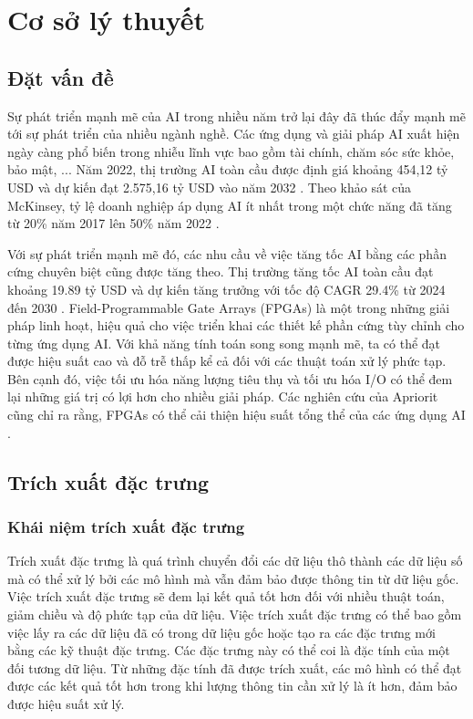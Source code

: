 \clearpage
{}

\setcounter{chapter}{0}
\chapter[{CƠ SỞ LÝ THUYẾT}]{Cơ sở lý thuyết}
\section{Đặt vấn đề}
Sự phát triển mạnh mẽ của AI trong nhiều năm trở lại đây đã thúc đẩy mạnh mẽ tới sự phát triển của nhiều ngành nghề. Các ứng dụng và giải pháp AI xuất hiện ngày càng phổ biến trong nhiễu lĩnh vực bao gồm tài chính, chăm sóc sức khỏe, bảo mật, ... Năm 2022, thị trường AI toàn cầu được định giá khoảng 454,12 tỷ USD và dự kiến đạt 2.575,16 tỷ USD vào năm 2032 \cite{AIMARKET}. Theo khảo sát của McKinsey, tỷ lệ doanh nghiệp áp dụng AI ít nhất trong một chức năng đã tăng từ 20\% năm 2017 lên 50\% năm 2022 \cite{mckinsey}.

Với sự phát triển mạnh mẽ đó, các nhu cầu về việc tăng tốc AI bằng các phần cứng chuyên biệt cũng được tăng theo. Thị trường tăng tốc AI toàn cầu đạt khoảng 19.89 tỷ USD và dự kiến tăng trưởng với tốc độ CAGR 29.4\% từ 2024 đến 2030 \cite{aiaccelerator}. 
Field-Programmable Gate Arrays (FPGAs) là một trong những giải pháp linh hoạt, hiệu quả cho việc triển khai các thiết kế phần cứng tùy chỉnh cho từng ứng dụng AI. Với khả năng tính toán song song mạnh mẽ, ta có thể đạt được hiệu suất cao và đỗ trễ thấp kể cả đối với các thuật toán xử lý phức tạp. Bên cạnh đó, việc tối ưu hóa năng lượng tiêu thụ và tối ưu hóa I/O có thể đem lại những giá trị có lợi hơn cho nhiều giải pháp. Các nghiên cứu của Apriorit cũng chỉ ra rằng, FPGAs có thể cải thiện hiệu suất tổng thể của các ứng dụng AI \cite{apriorit}.
\section{Trích xuất đặc trưng}
\subsection{Khái niệm trích xuất đặc trưng}
Trích xuất đặc trưng là quá trình chuyển đổi các dữ liệu thô thành các dữ liệu số mà có thể xử lý bởi các mô hình mà vẫn đảm bảo được thông tin từ dữ liệu gốc. Việc trích xuất đặc trưng sẽ đem lại kết quả tốt hơn đối với nhiều thuật toán, giảm chiều và độ phức tạp của dữ liệu. Việc trích xuất đặc trưng có thể bao gồm việc lấy ra các dữ liệu đã có trong dữ liệu gốc hoặc tạo ra các đặc trưng mới bằng các kỹ thuật đặc trưng. Các đặc trưng này có thể coi là đặc tính của một đối tương dữ liệu. Từ những đặc tính đã được trích xuất, các mô hình có thể đạt được các kết quả tốt hơn trong khi lượng thông tin cần xử lý là ít hơn, đảm bảo được hiệu suất xử lý. 

